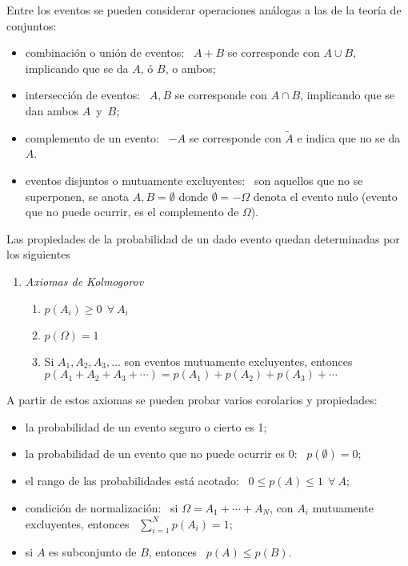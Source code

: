 Entre los eventos  se pueden considerar operaciones an\'alogas a  las de la teor\'ia
de conjuntos:
\begin{itemize}
\item combinaci\'on  o uni\'on  de eventos:  \ $A+B$ se  corresponde con  $A\cup B$,
  implicando que se da $A$, \'o $B$, o ambos;
%
\item intersecci\'on de eventos: \  $A,B$ se corresponde con $A\cap B$, implicando
  que se dan ambos $A$~y~$B$;
%
\item complemento  de un evento: \ $-A$  se corresponde con $\tilde  A$ e indica
  que no se da $A$.
%
\item  eventos disjuntos  o mutuamente  excluyentes: \  son aquellos  que  no se
  superponen,  se anota $A,B  = \emptyset$  donde $\emptyset=-\Omega$  denota el
  evento nulo (evento que no puede ocurrir, es el complemento de $\Omega$).
\end{itemize}

Las propiedades de la probabilidad de un dado evento quedan determinadas por los
siguientes

\begin{enumerate}
\item[]\emph{Axiomas de Kolmogorov}
%
  \begin{enumerate}
  \item $p(A_i) \geq 0 \ \ \forall \ A_i$
  \item $p(\Omega) = 1$
  \item Si $A_1, A_2, A_3,  \ldots$ son eventos mutuamente excluyentes, entonces
    $p(A_1+A_2+A_3+\cdots)=p(A_1)+p(A_2)+p(A_3)+\cdots$
  \end{enumerate}
\end{enumerate}

A partir de estos axiomas se pueden probar varios corolarios y propiedades:
%
\begin{itemize}
\item la probabilidad de un evento seguro o cierto es 1;
%
\item  la   probabilidad  de   un  evento   que  no  puede   ocurrir  es   0:  \
  $p(\emptyset)=0$;
%
\item el  rango de  las probabilidades  est\'a acotado: \  $0\leq p(A)\leq  1\ \
  \forall \ A$;
%
\item condici\'on  de normalizaci\'on:  \ si $\Omega=A_1+\cdots+A_N$,  con $A_i$
  mutuamente excluyentes, entonces \ $\sum_{i=1}^N p(A_i)=1$;
%
\item si $A$ es subconjunto de $B$, entonces \ $p(A)\leq p(B)$.
\end{itemize}

